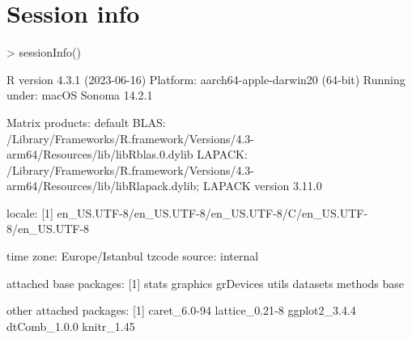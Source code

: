 \documentclass[10pt]{article}
\begin{document}
\section{Session info}
\begin{Schunk}
\begin{Sinput}
> sessionInfo()
\end{Sinput}
\begin{Soutput}
R version 4.3.1 (2023-06-16)
Platform: aarch64-apple-darwin20 (64-bit)
Running under: macOS Sonoma 14.2.1

Matrix products: default
BLAS:   /Library/Frameworks/R.framework/Versions/4.3-arm64/Resources/lib/libRblas.0.dylib 
LAPACK: /Library/Frameworks/R.framework/Versions/4.3-arm64/Resources/lib/libRlapack.dylib;  LAPACK version 3.11.0

locale:
[1] en_US.UTF-8/en_US.UTF-8/en_US.UTF-8/C/en_US.UTF-8/en_US.UTF-8

time zone: Europe/Istanbul
tzcode source: internal

attached base packages:
[1] stats     graphics  grDevices utils     datasets  methods   base     

other attached packages:
[1] caret_6.0-94   lattice_0.21-8 ggplot2_3.4.4  dtComb_1.0.0   knitr_1.45    


\end{Soutput}
\end{Schunk}
\end{document}

